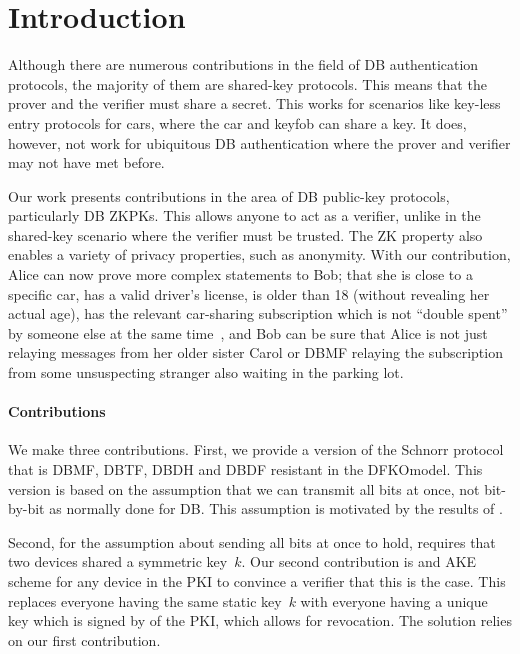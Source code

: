 \section{Introduction}%
\label{Introduction}

Although there are numerous contributions in the field of \ac{DB} 
authentication protocols, the majority of them are shared-key protocols.
This means that the prover and the verifier must share a secret.
This works for scenarios like key-less entry protocols for cars, where the car and keyfob 
can share a key.
It does, however, not work for ubiquitous \ac{DB} authentication where
the prover and verifier may not have met before.

Our work presents contributions in the area of \ac{DB} public-key protocols, 
particularly \ac{DB} \acp{ZKPK}.
This allows anyone to act as a verifier, unlike in the shared-key scenario 
where the verifier must be trusted.
The \ac{ZK} property also enables a variety of privacy properties, such as 
anonymity.
With our contribution, Alice can
now prove more complex statements to Bob; \eg that she is close to a specific car, has a valid driver's license, is older than 18 
(without revealing her actual age), has the relevant car-sharing subscription which is not 
\enquote{double spent} by someone else at the same time~\cite[\eg][]{AnonPass}, 
and  Bob can be sure that Alice is not just relaying messages 
from her older sister Carol or \ac{DBMF} relaying the subscription from some 
unsuspecting stranger also waiting in the parking lot.


\paragraph*{Contributions}

We make three contributions.
First, we provide a version of the Schnorr protocol that is \ac{DBMF}, 
\ac{DBTF}, \ac{DBDH} and \ac{DBDF} resistant in the \ac{DFKOmodel}.
This version is based on the assumption that we can transmit all bits at once, 
not bit-by-bit as normally done for \ac{DB}.
This assumption is motivated by the results of \textcite{UWBPR}.

Second, for the assumption about sending all bits at once to hold, 
\textcite{UWBPR} requires that two devices shared a symmetric key~\(k\).
Our second contribution is  and \ac{AKE} scheme for any device in 
the \ac{PKI} to convince a verifier that this is the case.
This replaces everyone having the same static key~\(k\) with everyone having a 
unique key which is signed by  of the \ac{PKI}, which allows for 
revocation.
The solution relies on our first contribution.

